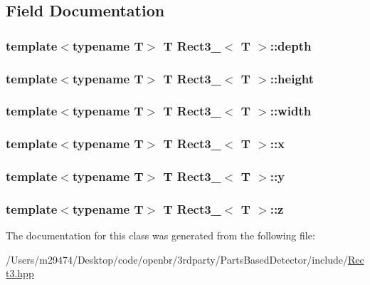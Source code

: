 \subsection{Field Documentation}
\hypertarget{class_rect3___a73850e016f7e8152e47d430239c47cc2}{
\subsubsection[{depth}]{\setlength{\rightskip}{0pt plus 5cm}template$<$typename T$>$ T {\bf Rect3\-\_\-}$<$ T $>$\-::depth}}\label{class_rect3___a73850e016f7e8152e47d430239c47cc2}
\hypertarget{class_rect3___a4f10fdcf15fe8cdb6b01a9b90d56ebe5}{
\subsubsection[{height}]{\setlength{\rightskip}{0pt plus 5cm}template$<$typename T$>$ T {\bf Rect3\-\_\-}$<$ T $>$\-::height}}\label{class_rect3___a4f10fdcf15fe8cdb6b01a9b90d56ebe5}
\hypertarget{class_rect3___a780cbb24a81d6bbfff26c2ac6660beb8}{
\subsubsection[{width}]{\setlength{\rightskip}{0pt plus 5cm}template$<$typename T$>$ T {\bf Rect3\-\_\-}$<$ T $>$\-::width}}\label{class_rect3___a780cbb24a81d6bbfff26c2ac6660beb8}
\hypertarget{class_rect3___a035f211c0c365a9dbd15436cb5448e31}{
\subsubsection[{x}]{\setlength{\rightskip}{0pt plus 5cm}template$<$typename T$>$ T {\bf Rect3\-\_\-}$<$ T $>$\-::x}}\label{class_rect3___a035f211c0c365a9dbd15436cb5448e31}
\hypertarget{class_rect3___ab2c61e4e318bc064eb8bb707b699cbb6}{
\subsubsection[{y}]{\setlength{\rightskip}{0pt plus 5cm}template$<$typename T$>$ T {\bf Rect3\-\_\-}$<$ T $>$\-::y}}\label{class_rect3___ab2c61e4e318bc064eb8bb707b699cbb6}
\hypertarget{class_rect3___a99bae7d4f2bf0af6a3ffbfb0fa752b9e}{
\subsubsection[{z}]{\setlength{\rightskip}{0pt plus 5cm}template$<$typename T$>$ T {\bf Rect3\-\_\-}$<$ T $>$\-::z}}\label{class_rect3___a99bae7d4f2bf0af6a3ffbfb0fa752b9e}


The documentation for this class was generated from the following file\-:\begin{DoxyCompactItemize}
\item 
/\-Users/m29474/\-Desktop/code/openbr/3rdparty/\-Parts\-Based\-Detector/include/\hyperlink{_rect3_8hpp}{Rect3.\-hpp}\end{DoxyCompactItemize}
